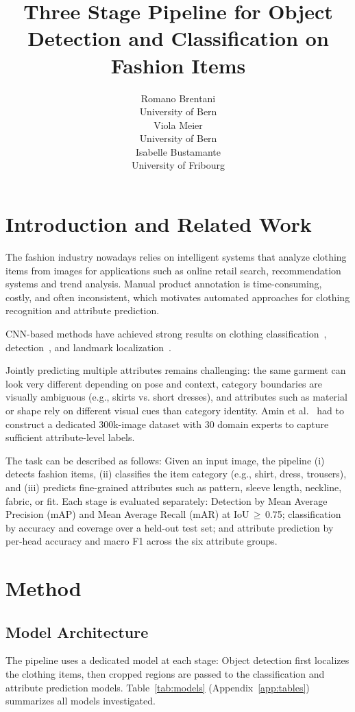 \documentclass{article}
\title{Three Stage Pipeline for Object Detection and Classification on Fashion Items}
\author{
  Romano Brentani \\
  University of Bern \\
  \And
  Viola Meier \\
  University of Bern \\
  \And
  Isabelle Bustamante \\
  University of Fribourg\\
}
\begin{document}
\maketitle

\section{Introduction and Related Work}

The fashion industry nowadays relies on intelligent systems that analyze clothing items from images for applications such as online retail search, recommendation systems and trend analysis. Manual product annotation is time-consuming, costly, and often inconsistent, which motivates automated approaches for clothing recognition and attribute prediction.

CNN-based methods have achieved strong results on clothing classification~\cite{bossard_2012}, detection~\cite{alamsyah_2019}, and landmark localization~\cite{wang_2018}.

Jointly predicting multiple attributes remains challenging: the same garment can look very different depending on pose and context, category boundaries are visually ambiguous (e.g., skirts vs. short dresses), and attributes such as material or shape rely on different visual cues than category identity. Amin et al.~\cite{amin2023fsap} had to construct a dedicated 300k-image dataset with 30 domain experts to capture sufficient attribute-level labels.

The task can be described as follows: Given an input image, the pipeline (i) detects fashion items, (ii) classifies the item category (e.g., shirt, dress, trousers), and (iii) predicts fine-grained attributes such as pattern, sleeve length, neckline, fabric, or fit. Each stage is evaluated separately: Detection by Mean Average Precision (mAP) and Mean Average Recall (mAR) at IoU\,$\geq$\,0.75; classification by accuracy and coverage over a held-out test set; and attribute prediction by per-head accuracy and macro F1 across the six attribute groups.

\section{Method}
\label{sec:method}

\subsection{Model Architecture}
The pipeline uses a dedicated model at each stage: Object detection first localizes the clothing items, then cropped regions are passed to the classification and attribute prediction models. Table~\ref{tab:models} (Appendix~\ref{app:tables}) summarizes all models investigated.
\end{document}
